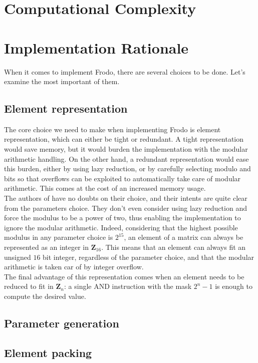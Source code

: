 



\section{Computational Complexity}

\section{Implementation Rationale}
When it comes to implement Frodo, there are several choices to be done. Let's examine the most important of them.

\subsection{Element representation}
The core choice we need to make when implementing Frodo is element representation, which can either be tight or redundant. A tight representation would save memory, but it would burden the implementation with the modular arithmetic handling. On the other hand, a redundant representation would ease this burden, either by using lazy reduction, or by carefully selecting modulo and bits so that overflows can be exploited to automatically take care of modular arithmetic. This comes at the cost of an increased memory usage.\\
The authors of \cite{frodo} have no doubts on their choice, and their intents are quite clear from the parameters choice. They don't even consider using lazy reduction and force the modulus to be a power of two, thus enabling the implementation to ignore the modular arithmetic. Indeed, considering that the highest possible modulus in any parameter choice is $2^{15}$, an element of a matrix can always be represented as an integer in $\mathbf{Z}_{16}$. This means that an element can always fit an unsigned $16$ bit integer, regardless of the parameter choice, and that the modular arithmetic is taken car of by integer overflow.\\
The final advantage of this representation comes when an element needs to be reduced to fit in $\mathbf{Z}_n$: a single AND instruction with the mask $2^{n}-1$ is enough to compute the desired value.

\subsection{Parameter generation}

\subsection{Element packing}
